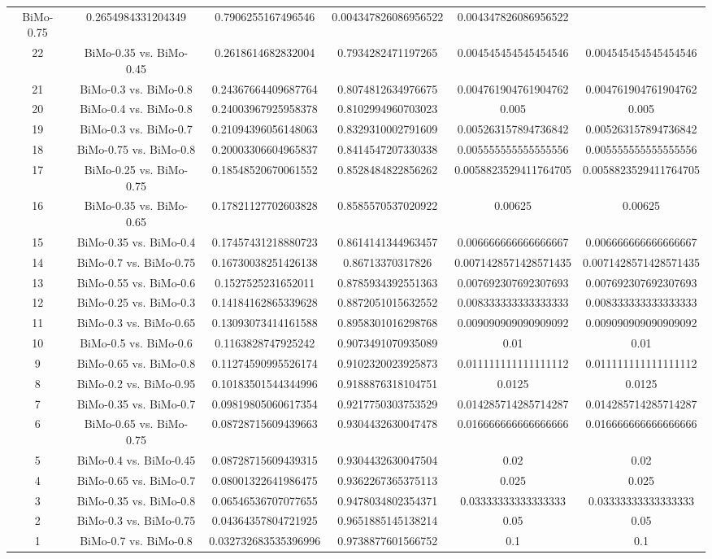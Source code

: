 \documentclass[a4paper,10pt]{article}
\begin{document}
\begin{landscape}
\begin{table}[!htp]
\begin{tabular}{cccccc}
BiMo-0.75&0.2654984331204349&0.7906255167496546&0.004347826086956522&0.004347826086956522\\22&BiMo-0.35 vs. BiMo-0.45&0.2618614682832004&0.7934282471197265&0.004545454545454546&0.004545454545454546\\21&BiMo-0.3 vs. BiMo-0.8&0.24367664409687764&0.8074812634976675&0.004761904761904762&0.004761904761904762\\20&BiMo-0.4 vs. BiMo-0.8&0.24003967925958378&0.8102994960703023&0.005&0.005\\19&BiMo-0.3 vs. BiMo-0.7&0.21094396056148063&0.8329310002791609&0.005263157894736842&0.005263157894736842\\18&BiMo-0.75 vs. BiMo-0.8&0.20003306604965837&0.8414547207330338&0.005555555555555556&0.005555555555555556\\17&BiMo-0.25 vs. BiMo-0.75&0.18548520670061552&0.8528484822856262&0.0058823529411764705&0.0058823529411764705\\16&BiMo-0.35 vs. BiMo-0.65&0.17821127702603828&0.8585570537020922&0.00625&0.00625\\15&BiMo-0.35 vs. BiMo-0.4&0.17457431218880723&0.8614141344963457&0.006666666666666667&0.006666666666666667\\14&BiMo-0.7 vs. BiMo-0.75&0.16730038251426138&0.86713370317826&0.0071428571428571435&0.0071428571428571435\\13&BiMo-0.55 vs. BiMo-0.6&0.1527525231652011&0.8785934392551363&0.007692307692307693&0.007692307692307693\\12&BiMo-0.25 vs. BiMo-0.3&0.14184162865339628&0.8872051015632552&0.008333333333333333&0.008333333333333333\\11&BiMo-0.3 vs. BiMo-0.65&0.13093073414161588&0.8958301016298768&0.009090909090909092&0.009090909090909092\\10&BiMo-0.5 vs. BiMo-0.6&0.1163828747925242&0.9073491070935089&0.01&0.01\\9&BiMo-0.65 vs. BiMo-0.8&0.11274590995526174&0.9102320023925873&0.011111111111111112&0.011111111111111112\\8&BiMo-0.2 vs. BiMo-0.95&0.10183501544344996&0.9188876318104751&0.0125&0.0125\\7&BiMo-0.35 vs. BiMo-0.7&0.09819805060617354&0.9217750303753529&0.014285714285714287&0.014285714285714287\\6&BiMo-0.65 vs. BiMo-0.75&0.08728715609439663&0.9304432630047478&0.016666666666666666&0.016666666666666666\\5&BiMo-0.4 vs. BiMo-0.45&0.08728715609439315&0.9304432630047504&0.02&0.02\\4&BiMo-0.65 vs. BiMo-0.7&0.08001322641986475&0.9362267365375113&0.025&0.025\\3&BiMo-0.35 vs. BiMo-0.8&0.06546536707077655&0.9478034802354371&0.03333333333333333&0.03333333333333333\\2&BiMo-0.3 vs. BiMo-0.75&0.04364357804721925&0.9651885145138214&0.05&0.05\\1&BiMo-0.7 vs. BiMo-0.8&0.032732683535396996&0.9738877601566752&0.1&0.1\\\hline

\end{tabular}
\end{table}
\end{landscape}
\end{document}
